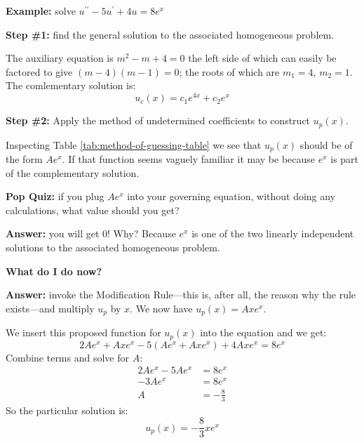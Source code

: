 \vspace{0.5cm}

\noindent\textbf{Example:} solve $u^{\prime \prime}-5u^{\prime}+4u=8e^x$

\vspace{0.25cm}

\noindent\textbf{Step \#1:} find the general solution to the associated homogeneous problem.

\vspace{0.25cm}

\noindent The auxiliary equation is $m^2-m+4=0$ the left side of which can easily be factored to give $(m-4)(m-1)=0$; the roots of which are $m_1=4$, $m_2=1$.  The comlementary solution is:
\begin{equation*}
u_c(x) = c_1e^{4x}+c_2e^{x}
\end{equation*} 

\noindent\textbf{Step \#2:} Apply the method of undetermined coefficients to construct $u_p(x)$.

\vspace{0.25cm}

\noindent Inspecting Table \ref{tab:method-of-guessing-table} we see that $u_p(x)$ should be of the form $Ae^{x}$.  If that function seems vaguely familiar it may be because $e^x$ is part of the complementary solution. 

\vspace{0.25cm}

\noindent\textbf{Pop Quiz:} if you plug $Ae^{x}$ into your governing equation, without doing any calculations, what value should you get?

\vspace{0.25cm}

\noindent\textbf{Answer:} you will get 0!  Why? Because $e^{x}$ is one of the two linearly independent solutions to the associated homogeneous problem. 

\vspace{0.25cm}

\noindent\textbf{What do I do now?}

\vspace{0.25cm}

\noindent\textbf{Answer: } invoke the Modification Rule---this is, after all, the reason why the rule exists---and multiply $u_p$ by $x$.  We now have $u_p(x) = Axe^x$.

\vspace{0.25cm}

\noindent We insert this proposed function for $u_p(x)$ into the equation and we get:
\begin{equation*}
2Ae^x+Axe^x - 5(Ae^x+Axe^x) + 4Axe^x = 8e^x
\end{equation*} 
Combine terms and solve for $A$:
\begin{align*}
2Ae^x-5Ae^x &= 8e^x \\
-3Ae^x &= 8e^x \\
A &= -\frac{8}{3}
\end{align*}
So the particular solution is:
\begin{equation*}
u_p(x) = -\frac{8}{3}xe^x
\end{equation*}

